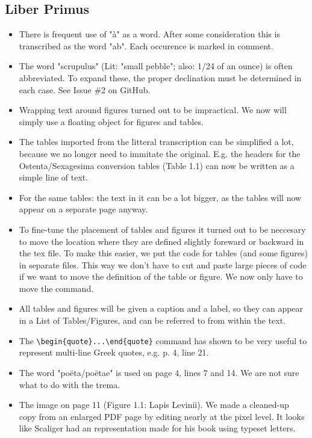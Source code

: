 \documentclass{report}
\begin{document}
\subsection{Liber Primus}
\begin{itemize}
\item
There is frequent use of "à" as a word. After some consideration this
is transcribed as the word "ab". Each occurence is marked in comment.
\item
The word "scrupulus" (Lit: "small pebble"; also: 1/24 of an ounce)
is often abbreviated. To expand these, the proper
declination must be determined in each case. See Issue \#2 on GitHub.
\item
Wrapping text around figures turned out to be impractical. We now will
simply use a floating object for figures and tables.
\item
The tables imported from the litteral transcription can be simplified
a lot, because we no longer need to immitate the original. E.g. the headers
for the Ostenta/Sexagesima conversion tables (Table 1.1) can now be written
as a simple line of text.
\item
For the same tables: the text in it can be a lot bigger, as the tables
will now appear on a separate page anyway.
\item
To fine-tune the placement of tables and figures it turned out to be
neccesary to move the location where they are defined slightly foreward or
backward in the tex file. To make this easier, we put the code for tables
 (and some figures) in separate files.
This way we don't have to cut and paste large pieces of code if we want to
move the definition of the table or figure. We now only have to move the
\verb++ command.
\item
All tables and figures will be given a caption and a label, so they can
appear in a List of Tables/Figures, and can be referred to from within the
text.
\item
The \verb+\begin{quote}...\end{quote}+ command has shown to be
very useful to represent multi-line Greek quotes, e.g. p. 4, line 21.
\item
The word "poëta/poëtae" is used on page 4, lines 7 and 14. We are not sure
what to do with the trema.
\item
The image on page 11 (Figure 1.1: Lapis Levinii). We made a cleaned-up copy
from an enlarged PDF page by editing nearly at the pixel level. It looks like
Scaliger had an representation made for his book using typeset letters.

\end{itemize}
\end{document}
